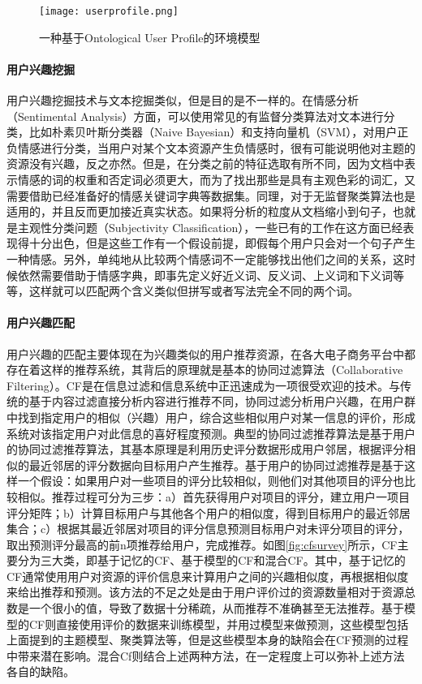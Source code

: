 \begin{figure}
\centering
\texttt{[image: userprofile.png]}
\caption{一种基于Ontological User Profile的环境模型}
\label{fig:useprofile}
\end{figure}

\paragraph{用户兴趣挖掘}
用户兴趣挖掘技术与文本挖掘类似，但是目的是不一样的。在情感分析（Sentimental Analysis）方面，可以使用常见的有监督分类算法对文本进行分类，比如朴素贝叶斯分类器（Naive Bayesian）和支持向量机（SVM），对用户正负情感进行分类\cite{pang2008opinion}，当用户对某个文本资源产生负情感时，很有可能说明他对主题的资源没有兴趣，反之亦然。但是，在分类之前的特征选取有所不同，因为文档中表示情感的词的权重和否定词必须更大，而为了找出那些是具有主观色彩的词汇，又需要借助已经准备好的情感关键词字典等数据集。同理，对于无监督聚类算法也是适用的，并且反而更加接近真实状态\cite{taboada2011lexicon,taboada2007thumbs}。如果将分析的粒度从文档缩小到句子，也就是主观性分类问题（Subjectivity Classification），一些已有的工作\cite{riloff2006feature, riloff2003learning, wiebe2004learning, wilson2006recognizing}在这方面已经表现得十分出色，但是这些工作有一个假设前提，即假每个用户只会对一个句子产生一种情感。另外，单纯地从比较两个情感词不一定能够找出他们之间的关系，这时候依然需要借助于情感字典\cite{miller1990introduction}，即事先定义好近义词、反义词、上义词和下义词等等，这样就可以匹配两个含义类似但拼写或者写法完全不同的两个词。

\paragraph{用户兴趣匹配}
用户兴趣的匹配主要体现在为兴趣类似的用户推荐资源，在各大电子商务平台中都存在着这样的推荐系统，其背后的原理就是基本的协同过滤算法（Collaborative Filtering）\cite{su2009survey,shi2014collaborative}。CF是在信息过滤和信息系统中正迅速成为一项很受欢迎的技术。与传统的基于内容过滤直接分析内容进行推荐不同，协同过滤分析用户兴趣，在用户群中找到指定用户的相似（兴趣）用户，综合这些相似用户对某一信息的评价，形成系统对该指定用户对此信息的喜好程度预测。典型的协同过滤推荐算法是基于用户的协同过滤推荐算法，其基本原理是利用历史评分数据形成用户邻居，根据评分相似的最近邻居的评分数据向目标用户产生推荐。基于用户的协同过滤推荐是基于这样一个假设：如果用户对一些项目的评分比较相似，则他们对其他项目的评分也比较相似。推荐过程可分为三步：a）首先获得用户对项目的评分，建立用户一项目评分矩阵；b）计算目标用户与其他各个用户的相似度，得到目标用户的最近邻居集合；c）根据其最近邻居对项目的评分信息预测目标用户对未评分项目的评分，取出预测评分最高的前n项推荐给用户，完成推荐。如图\ref{fig:cfsurvey}所示，CF主要分为三大类，即基于记忆的CF、基于模型的CF和混合CF。其中，基于记忆的CF通常使用用户对资源的评价信息来计算用户之间的兴趣相似度，再根据相似度来给出推荐和预测。该方法的不足之处是由于用户评价过的资源数量相对于资源总数是一个很小的值，导致了数据十分稀疏，从而推荐不准确甚至无法推荐。基于模型的CF则直接使用评价的数据来训练模型，并用过模型来做预测，这些模型包括上面提到的主题模型、聚类算法等，但是这些模型本身的缺陷会在CF预测的过程中带来潜在影响。混合Cf则结合上述两种方法，在一定程度上可以弥补上述方法各自的缺陷。

